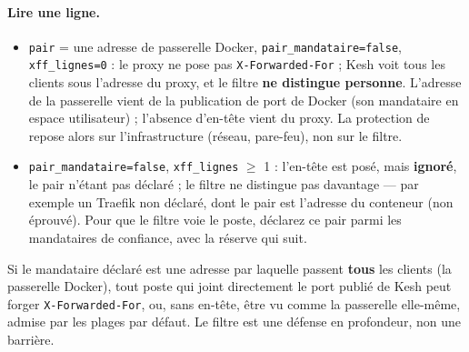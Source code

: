 \documentclass[a4paper,11pt,oneside]{article}
\begin{document}
\paragraph{Lire une ligne.}
\begin{itemize}
    \item \texttt{pair} = une adresse de passerelle Docker, \texttt{pair\_mandataire=false}, \texttt{xff\_lignes=0} : le proxy ne pose pas \texttt{X-Forwarded-For} ; Kesh voit tous les clients sous l'adresse du proxy, et le filtre \textbf{ne distingue personne}. L'adresse de la passerelle vient de la publication de port de Docker (son mandataire en espace utilisateur) ; l'absence d'en-tête vient du proxy. La protection de  repose alors sur l'infrastructure (réseau, pare-feu), non sur le filtre.
    \item \texttt{pair\_mandataire=false}, \texttt{xff\_lignes} $\geq$ 1 : l'en-tête est posé, mais \textbf{ignoré}, le pair n'étant pas déclaré ; le filtre ne distingue pas davantage --- par exemple un Traefik non déclaré, dont le pair est l'adresse du conteneur (non éprouvé). Pour que le filtre voie le poste, déclarez ce pair parmi les mandataires de confiance, avec la réserve qui suit.
\end{itemize}

\begin{keshwarning}
Si le mandataire déclaré est une adresse par laquelle passent \textbf{tous} les clients (la passerelle Docker), tout poste qui joint directement le port publié de Kesh peut forger \texttt{X-Forwarded-For}, ou, sans en-tête, être vu comme la passerelle elle-même, admise par les plages par défaut. Le filtre est une défense en profondeur, non une barrière.
\end{keshwarning}
\end{document}
